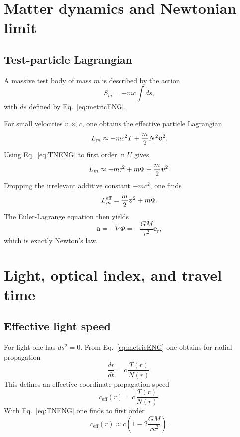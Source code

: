 \documentclass[11pt,a4paper]{article}
\begin{document}
\section{Matter dynamics and Newtonian limit}
\subsection{Test-particle Lagrangian}
A massive test body of mass $m$ is described by the action
\begin{equation}
 S_m=-mc\int ds,
\end{equation}
with $ds$ defined by Eq.~\eqref{eq:metricENG}.

For small velocities $v\ll c$, one obtains the effective particle Lagrangian
\begin{equation}
 L_m \approx -mc^2 T + \frac{m}{2} N^2 \vb*{v}^2.
\end{equation}
Using Eq.~\eqref{eq:TNENG} to first order in $U$ gives
\begin{equation}
 L_m \approx -mc^2 + m\Phi + \frac{m}{2}\vb*{v}^2.
\end{equation}
Dropping the irrelevant additive constant $-mc^2$, one finds
\begin{equation}
 L_m^{\text{eff}} = \frac{m}{2}\vb*{v}^2 + m\Phi.
\end{equation}
The Euler-Lagrange equation then yields
\begin{equation}
 \bm a = -\nabla \Phi = -\frac{GM}{r^2}\bm e_r,
\end{equation}
which is exactly Newton's law.

\section{Light, optical index, and travel time}
\subsection{Effective light speed}
For light one has $ds^2=0$. From Eq.~\eqref{eq:metricENG} one obtains for radial propagation
\begin{equation}
 \frac{dr}{dt} = c\,\frac{T(r)}{N(r)}.
\end{equation}
This defines an effective coordinate propagation speed
\begin{equation}
 c_{\text{eff}}(r)= c\,\frac{T(r)}{N(r)}.
\end{equation}
With Eq.~\eqref{eq:TNENG} one finds to first order
\begin{equation}
 c_{\text{eff}}(r)\approx c\left(1-2\frac{GM}{rc^2}\right).
\end{equation}
\end{document}
